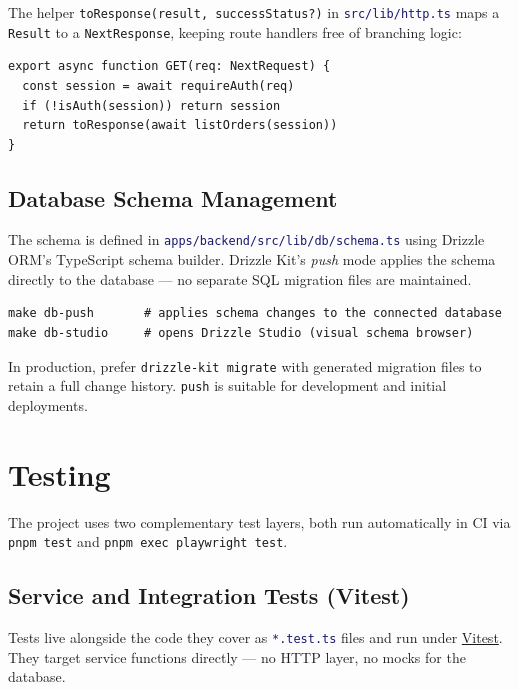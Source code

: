 \documentclass[12pt,a4paper,twoside]{report}
\newcommand{\warnbox}[1]{\begin{tcolorbox}[warnboxstyle]#1\end{tcolorbox}}
\newcommand{\code}[1]{\texttt{#1}}
\newcommand{\file}[1]{\texttt{\textcolor{MidnightBlue}{#1}}}
\begin{document}
The helper \code{toResponse(result, successStatus?)} in
\file{src/lib/http.ts} maps a \code{Result} to a \code{NextResponse},
keeping route handlers free of branching logic:

\begin{lstlisting}[style=ts]
export async function GET(req: NextRequest) {
  const session = await requireAuth(req)
  if (!isAuth(session)) return session
  return toResponse(await listOrders(session))
}
\end{lstlisting}

\section{Database Schema Management}
\label{sec:dbmigrations}

The schema is defined in \file{apps/backend/src/lib/db/schema.ts} using
Drizzle ORM's TypeScript schema builder. Drizzle Kit's \emph{push} mode
applies the schema directly to the database — no separate SQL migration
files are maintained.

\begin{lstlisting}[style=bash]
make db-push       # applies schema changes to the connected database
make db-studio     # opens Drizzle Studio (visual schema browser)
\end{lstlisting}

\warnbox{In production, prefer \code{drizzle-kit migrate} with generated
migration files to retain a full change history. \code{push} is
suitable for development and initial deployments.}

\chapter{Testing}
\label{ch:testing}

The project uses two complementary test layers, both run automatically
in CI via \code{pnpm test} and \code{pnpm exec playwright test}.

\section{Service and Integration Tests (Vitest)}
\label{sec:unit-tests}

Tests live alongside the code they cover as \file{*.test.ts} files and
run under \href{https://vitest.dev}{Vitest}. They target service
functions directly — no HTTP layer, no mocks for the database.
\end{document}
